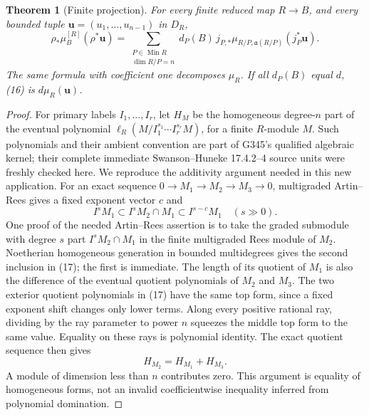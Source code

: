 \documentclass[11pt]{article}
\newtheorem{theorem}{Theorem}
\begin{document}
\begin{theorem}[Finite projection]
For every finite reduced map \(R\to B\), and every bounded tuple
\(\boldsymbol u=(u_1,\ldots,u_{n-1})\) in \(D_R\),
\[
 \rho_*\mu_B^{[R]}(\rho^*\boldsymbol u)
  =\sum_{\substack{P\in\operatorname{Min}R\\\dim R/P=n}}
       d_P(B)\,j_{P,*}\mu_{R/P,\mathfrak a(R/P)}
                                  (j_P^*\boldsymbol u).        \tag{16}
\]
The same formula with coefficient one decomposes \(\mu_R\).
If all \(d_P(B)\) equal \(d\), (16) is \(d\mu_R(\boldsymbol u)\).
\end{theorem}
\begin{proof}
For primary labels \(I_1,\ldots,I_r\), let \(H_M\) be the homogeneous
degree-\(n\) part of the eventual polynomial
\(\ell_R(M/I_1^{s_1}\cdots I_r^{s_r}M)\), for a finite \(R\)-module
\(M\). Such polynomials and their ambient convention are part of
G345's qualified algebraic kernel; their complete immediate
Swanson--Huneke 17.4.2--4 source units were freshly checked here.
We reproduce the additivity argument needed in this new application.
For an exact sequence \(0\to M_1\to M_2\to M_3\to0\),
multigraded Artin--Rees gives a fixed exponent vector \(c\) and
\[
 I^sM_1\subset I^sM_2\cap M_1\subset I^{s-c}M_1\quad(s\gg0).
 \tag{17}
\]
One proof of the needed Artin--Rees assertion is to take the graded
submodule with degree \(s\) part \(I^sM_2\cap M_1\) in the finite
multigraded Rees module of \(M_2\). Noetherian homogeneous generation
in bounded multidegrees gives the second inclusion in (17); the
first is immediate. The length of its quotient of \(M_1\) is also
the difference of the eventual quotient polynomials of \(M_2\)
and \(M_3\). The two exterior quotient polynomials in (17) have
the same top form, since a fixed exponent shift changes only
lower terms. Along every positive rational ray, dividing by the
ray parameter to power \(n\) squeezes the middle top form to the
same value. Equality on these rays is polynomial identity.
The exact quotient sequence then gives
\[
 H_{M_2}=H_{M_1}+H_{M_3}.                                    \tag{18}
\]
A module of dimension less than \(n\) contributes zero.
This argument is equality of homogeneous forms, not an invalid
coefficientwise inequality inferred from polynomial domination.


\end{proof}
\end{document}
